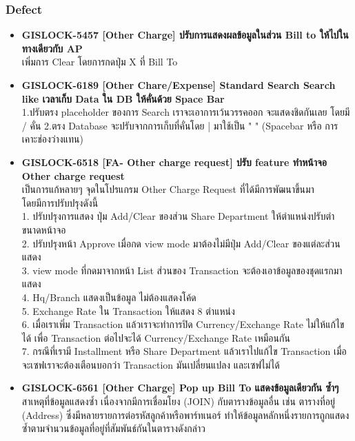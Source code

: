 \subsubsection{Defect}
\begin{itemize}
    \setlength\itemsep{1em}
    \sloppy
    \item \textbf{{GISLOCK-5457 [Other Charge] ปรับการแสดงผลข้อมูลในส่วน Bill to ให้ไปในทางเดียวกับ AP}} \\
          เพิ่มการ Clear โดยการกดปุ่ม X ที่ Bill To
    \item \textbf{{GISLOCK-6189 [Other Chare/Expense] Standard Search Search like เวลาเก็บ Data ใน DB ให้คั่นด้วย Space Bar}} \\
          1.ปรับตรง placeholder ของการ Search เราจะเอาการเว้นวรรคออก จะแสดงชิดกันเลย โดยมี / คั่น
          2.ตรง Database จะปรับจากการเก็บที่คั่นโดย | มาใช้เป็น " " (Spacebar หรือ การเคาะช่องว่างแทน) 
    \item \textbf{{GISLOCK-6518 [FA- Other charge request] ปรับ feature ทำหน้าจอ Other charge request}} \\
          เป็นการแก้หลายๆ จุดในโปรแกรม Other Charge Request ที่ได้มีการพัฒนาขึ้นมา \\
            โดยมีการปรับปรุงดังนี้ \\
            1. ปรับปรุงการแสดง ปุ่ม Add/Clear ของส่วน Share Department ให้ตำแหน่งปรับตำขนาดหน้าจอ\\
            2. ปรับปรุงหน้า Approve เมื่อกด view mode มาต้องไม่มีปุ่ม Add/Clear ของแต่ละส่วนแสดง \\
            3. view mode ที่กดมาจากหน้า List ส่วนของ Transaction จะต้องเอาข้อมูลของชุดแรกมาแสดง \\
            4. Hq/Branch แสดงเป็นข้อมูล ไม่ต้องแสดงโค้ด \\
            5. Exchange Rate ใน Transaction ให้แสดง 8 ตำแหน่ง \\
            6. เมื่อเราเพิ่ม Transaction แล้วเราจะทำการปิด Currency/Exchange Rate ไม่ให้แก้ไขได้ เพื่อ Transaction ต่อไปจะได้ Currency/Exchange Rate เหมือนกัน\\
            7. กรณีที่เรามี Installment หรือ Share Department แล้วเราไปแก้ไข Transaction เมื่อจะเซฟเราจะต้องเตือนบอกว่า Transaction มันเปลี่ยนแปลง และเซฟไม่ได้ 
    \item \textbf{{GISLOCK-6561 [Other Charge] Pop up \: Bill To แสดงข้อมูลเดียวกัน ซ้ำๆ}} \\
          สาเหตุที่ข้อมูลแสดงซ้ำ เนื่องจากมีการเชื่อมโยง (JOIN) กับตารางข้อมูลอื่น เช่น ตารางที่อยู่ (Address) ซึ่งมีหลายรายการต่อรหัสลูกค้าหรือพาร์ทเนอร์ ทำให้ข้อมูลหลักหนึ่งรายการถูกแสดงซ้ำตามจำนวนข้อมูลที่อยู่ที่สัมพันธ์กันในตารางดังกล่าว \\

\end{itemize}
